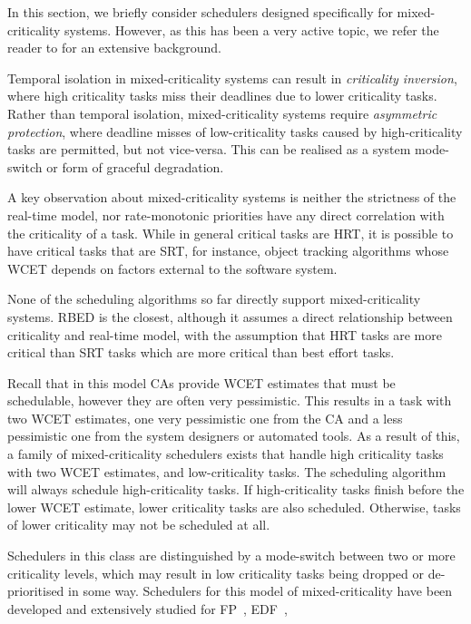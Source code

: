 In this section, we briefly consider schedulers designed specifically for mixed-criticality systems. 
However, as this has been a very active topic, we refer the reader to \citet{Burns_Davis_17} for
an extensive background. 

Temporal isolation in mixed-criticality systems can result in \emph{criticality inversion}, where
high criticality tasks miss their deadlines due to lower criticality tasks.  Rather than temporal
isolation, mixed-criticality systems require \emph{asymmetric protection}, where deadline misses of
low-criticality tasks caused by high-criticality tasks are permitted, but not vice-versa.  This can
be realised as a system mode-switch or form of graceful degradation.

A key observation about mixed-criticality systems is neither the strictness of the real-time model,
nor rate-monotonic priorities have any direct correlation with the criticality of a task.  While in
general critical tasks are \gls{HRT}, it is possible to have critical tasks that are \gls{SRT}, for
instance, object tracking algorithms whose \gls{WCET} depends on factors external to the software
system.

None of the scheduling algorithms so far directly support mixed-criticality systems.  \gls{RBED} is
the closest, although it assumes a direct relationship between criticality and real-time model, with
the assumption that \gls{HRT} tasks are more critical than \gls{SRT} tasks which are more critical
than best effort tasks. 

Recall that in this model \glspl{CA} provide \gls{WCET} estimates that must be schedulable, however they are often very
pessimistic.  This results in a task with two {\gls{WCET}} estimates, one very pessimistic one from
the \gls{CA} and a less pessimistic one from the system designers or automated tools.  As a result
of this, a family of mixed-criticality schedulers exists that handle high criticality tasks with two
{\gls{WCET}} estimates, and low-criticality tasks.  The scheduling algorithm will always schedule
high-criticality tasks.  If high-criticality tasks finish before the lower \gls{WCET} estimate,
lower criticality tasks are also scheduled.  Otherwise, tasks of lower criticality may not be
scheduled at all. 

Schedulers in this class are distinguished by a mode-switch between two or more criticality levels,
which may result in low criticality tasks being dropped or de-prioritised in some way. 
Schedulers for this model of mixed-criticality have been developed and extensively studied for
\gls{FP}~\citet{Vestal_07, Pathan:phd}, \gls{EDF}~\citet{Baruah_BDMVS_11},


